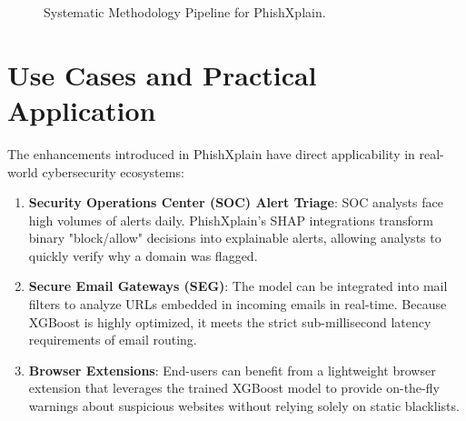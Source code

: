 \begin{figure}[H]
\centering
{}
\caption{Systematic Methodology Pipeline for PhishXplain.}
\label{fig:flowchart}
\end{figure}

\section{Use Cases and Practical Application}
\label{sec:usecases}
The enhancements introduced in PhishXplain have direct applicability in real-world cybersecurity ecosystems:

\begin{enumerate}
    \item \textbf{Security Operations Center (SOC) Alert Triage}: SOC analysts face high volumes of alerts daily. PhishXplain’s SHAP integrations transform binary "block/allow" decisions into explainable alerts, allowing analysts to quickly verify why a domain was flagged.
    \item \textbf{Secure Email Gateways (SEG)}: The model can be integrated into mail filters to analyze URLs embedded in incoming emails in real-time. Because XGBoost is highly optimized, it meets the strict sub-millisecond latency requirements of email routing.
    \item \textbf{Browser Extensions}: End-users can benefit from a lightweight browser extension that leverages the trained XGBoost model to provide on-the-fly warnings about suspicious websites without relying solely on static blacklists.
\end{enumerate}

